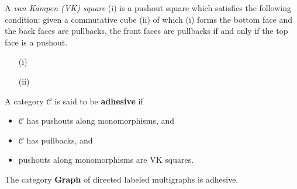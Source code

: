 
\begin{definition}
    \label{def:vk_square}
    A \textit{van Kampen (VK) square} (i) is a pushout square which satisfies the following condition: given a commutative cube (ii) of which (i) forms the bottom face and the back faces are pullbacks, the front faces are pullbacks if and only if the top face is a pushout.

    
    \begin{enumerate} 
        \item[(i)]
    
        \item[(ii)]
    \end{enumerate}
\end{definition} 

\begin{definition} 
    \label{def:adhesive_cat}
    A category $\mathcal{C}$ is said to be \textbf{adhesive} if 
    \begin{itemize}
        \item $\mathcal{C}$ has pushouts along  monomorphisms, and
        \item $\mathcal{C}$ has pullbacks, and
        \item pushouts along monomorphisms are VK squares.
    \end{itemize}
\end{definition}

\begin{proposition}
    \label{prop:graph_adhesive}
    The category \textbf{Graph} of directed labeled multigraphs is adhesive.
\end{proposition}